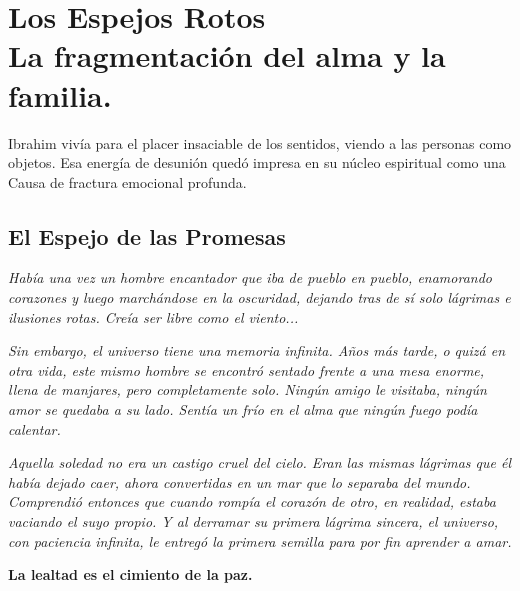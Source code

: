 \chapter[Los Espejos Rotos]{Los Espejos Rotos\\ \large La fragmentación del alma y la familia.}


\lettrine[lines=3, nindent=0.5em, findent=0.2em]{I}{}brahim vivía para el placer insaciable de los sentidos, viendo a las personas como objetos. Esa energía de desunión quedó impresa en su núcleo espiritual como una Causa de fractura emocional profunda.

\section{El Espejo de las Promesas}
\begin{elegantquote}
\textit{Había una vez un hombre encantador que iba de pueblo en pueblo, enamorando corazones y luego marchándose en la oscuridad, dejando tras de sí solo lágrimas e ilusiones rotas. Creía ser libre como el viento...}

\textit{Sin embargo, el universo tiene una memoria infinita. Años más tarde, o quizá en otra vida, este mismo hombre se encontró sentado frente a una mesa enorme, llena de manjares, pero completamente solo. Ningún amigo le visitaba, ningún amor se quedaba a su lado. Sentía un frío en el alma que ningún fuego podía calentar.}

\textit{Aquella soledad no era un castigo cruel del cielo. Eran las mismas lágrimas que él había dejado caer, ahora convertidas en un mar que lo separaba del mundo. Comprendió entonces que cuando rompía el corazón de otro, en realidad, estaba vaciando el suyo propio. Y al derramar su primera lágrima sincera, el universo, con paciencia infinita, le entregó la primera semilla para por fin aprender a amar.}

\end{elegantquote}

\vspace{1em}
\begin{center}
    \textbf{\Large La lealtad es el cimiento de la paz.}
\end{center}
\vspace{1em}

